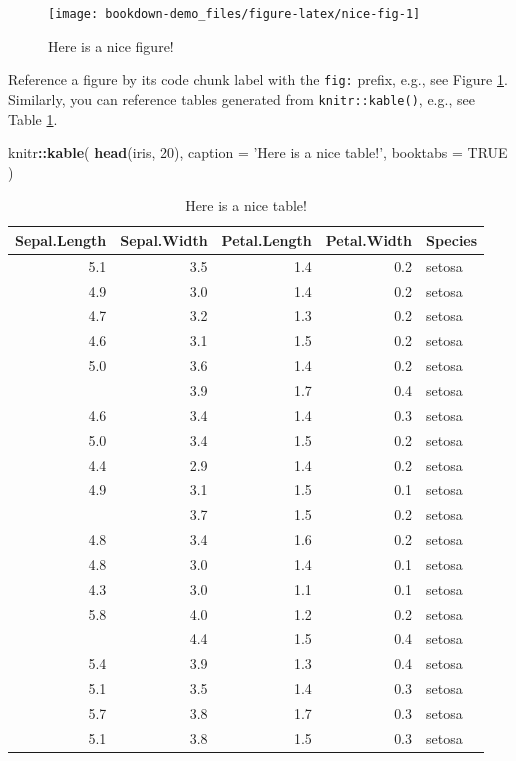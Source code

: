 \documentclass[]{book}
\newenvironment{Shaded}{\begin{snugshade}}{\end{snugshade}}
\newcommand{\KeywordTok}[1]{\textcolor[rgb]{0.13,0.29,0.53}{\textbf{#1}}}
\newcommand{\DataTypeTok}[1]{\textcolor[rgb]{0.13,0.29,0.53}{#1}}
\newcommand{\DecValTok}[1]{\textcolor[rgb]{0.00,0.00,0.81}{#1}}
\newcommand{\StringTok}[1]{\textcolor[rgb]{0.31,0.60,0.02}{#1}}
\newcommand{\OtherTok}[1]{\textcolor[rgb]{0.56,0.35,0.01}{#1}}
\newcommand{\OperatorTok}[1]{\textcolor[rgb]{0.81,0.36,0.00}{\textbf{#1}}}
\newcommand{\NormalTok}[1]{#1}
\begin{document}
\begin{figure}

{\centering \texttt{[image: bookdown-demo\_files/figure-latex/nice-fig-1]} 

}

\caption{Here is a nice figure!}\label{fig:nice-fig}
\end{figure}

Reference a figure by its code chunk label with the \texttt{fig:}
prefix, e.g., see Figure \ref{fig:nice-fig}. Similarly, you can
reference tables generated from \texttt{knitr::kable()}, e.g., see Table
\ref{tab:nice-tab}.

\begin{Shaded}
\begin{Highlighting}[]
\NormalTok{knitr}\OperatorTok{::}\KeywordTok{kable}\NormalTok{(}
  \KeywordTok{head}\NormalTok{(iris, }\DecValTok{20}\NormalTok{), }\DataTypeTok{caption =} \StringTok{'Here is a nice table!'}\NormalTok{,}
  \DataTypeTok{booktabs =} \OtherTok{TRUE}
\NormalTok{)}
\end{Highlighting}
\end{Shaded}

\begin{table}[t]

\caption{\label{tab:nice-tab}Here is a nice table!}
\centering
\begin{tabular}{rrrrl}
\toprule
Sepal.Length & Sepal.Width & Petal.Length & Petal.Width & Species\\
\midrule
5.1 & 3.5 & 1.4 & 0.2 & setosa\\
4.9 & 3.0 & 1.4 & 0.2 & setosa\\
4.7 & 3.2 & 1.3 & 0.2 & setosa\\
4.6 & 3.1 & 1.5 & 0.2 & setosa\\
5.0 & 3.6 & 1.4 & 0.2 & setosa\\
\addlinespace
5.4 & 3.9 & 1.7 & 0.4 & setosa\\
4.6 & 3.4 & 1.4 & 0.3 & setosa\\
5.0 & 3.4 & 1.5 & 0.2 & setosa\\
4.4 & 2.9 & 1.4 & 0.2 & setosa\\
4.9 & 3.1 & 1.5 & 0.1 & setosa\\
\addlinespace
5.4 & 3.7 & 1.5 & 0.2 & setosa\\
4.8 & 3.4 & 1.6 & 0.2 & setosa\\
4.8 & 3.0 & 1.4 & 0.1 & setosa\\
4.3 & 3.0 & 1.1 & 0.1 & setosa\\
5.8 & 4.0 & 1.2 & 0.2 & setosa\\
\addlinespace
5.7 & 4.4 & 1.5 & 0.4 & setosa\\
5.4 & 3.9 & 1.3 & 0.4 & setosa\\
5.1 & 3.5 & 1.4 & 0.3 & setosa\\
5.7 & 3.8 & 1.7 & 0.3 & setosa\\
5.1 & 3.8 & 1.5 & 0.3 & setosa\\
\bottomrule
\end{tabular}
\end{table}
\end{document}

